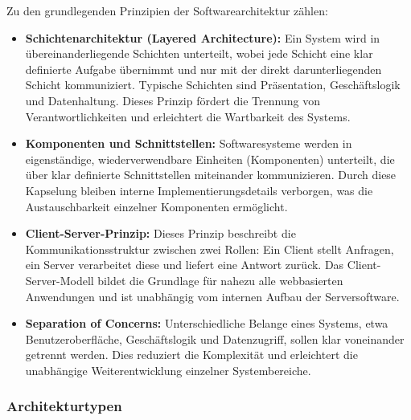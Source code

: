 Zu den grundlegenden Prinzipien der Softwarearchitektur zählen:

\begin{itemize}

    \item \textbf{Schichtenarchitektur (Layered Architecture):}
          Ein System wird in übereinanderliegende Schichten unterteilt, wobei jede
          Schicht eine klar definierte Aufgabe übernimmt und nur mit der direkt
          darunterliegenden Schicht kommuniziert.
          Typische Schichten sind Präsentation, Geschäftslogik und Datenhaltung.
          Dieses Prinzip fördert die Trennung von Verantwortlichkeiten und erleichtert
          die Wartbarkeit des Systems. \cite{bass2012software}

    \item \textbf{Komponenten und Schnittstellen:}
          Softwaresysteme werden in eigenständige, wiederverwendbare Einheiten
          (Komponenten) unterteilt, die über klar definierte Schnittstellen miteinander
          kommunizieren.
          Durch diese Kapselung bleiben interne Implementierungsdetails verborgen,
          was die Austauschbarkeit einzelner Komponenten ermöglicht. \cite{bass2012software}

    \item \textbf{Client-Server-Prinzip:}
          Dieses Prinzip beschreibt die Kommunikationsstruktur zwischen zwei Rollen:
          Ein Client stellt Anfragen, ein Server verarbeitet diese und liefert eine
          Antwort zurück.
          Das Client-Server-Modell bildet die Grundlage für nahezu alle webbasierten
          Anwendungen und ist unabhängig vom internen Aufbau der Serversoftware.
          \cite{fielding2000rest,kitrum_client_server}

    \item \textbf{Separation of Concerns:}
          Unterschiedliche Belange eines Systems, etwa Benutzeroberfläche,
          Geschäftslogik und Datenzugriff, sollen klar voneinander getrennt werden.
          Dies reduziert die Komplexität und erleichtert die unabhängige
          Weiterentwicklung einzelner Systembereiche. \cite{bass2012software}

\end{itemize}

\subsubsection{Architekturtypen}

